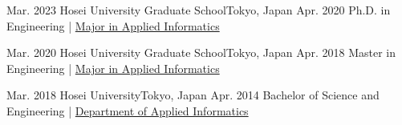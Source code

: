
\begin{educations}
    \education
    {Mar. 2023} {Hosei University Graduate School}{Tokyo, Japan}{}
    {Apr. 2020} {Ph.D. in Engineering | \href{https://www.hosei.ac.jp/english/admissions/graduate/jbdp/science_engineering/applied_informatics/}{Major in Applied Informatics}}

    \emptySeparator
    \education
    {Mar. 2020} {Hosei University Graduate School}{Tokyo, Japan}{}
    {Apr. 2018} {Master in Engineering | \href{https://www.hosei.ac.jp/english/admissions/graduate/jbdp/science_engineering/applied_informatics/}{Major in Applied Informatics}}

    \emptySeparator
    \education
    {Mar. 2018} {Hosei University}{Tokyo, Japan}{}
    {Apr. 2014} {Bachelor of Science and Engineering | \href{https://www.hosei.ac.jp/english/admissions/undergraduate/jbdp/faculty/science/informatics}{Department of Applied Informatics}}
\end{educations}

